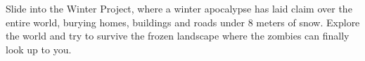 Slide into the Winter Project, where a winter apocalypse has laid claim over the entire world, burying homes, buildings and roads under 8 meters of snow. Explore the world and try to survive the frozen landscape where the zombies can finally look up to you. 